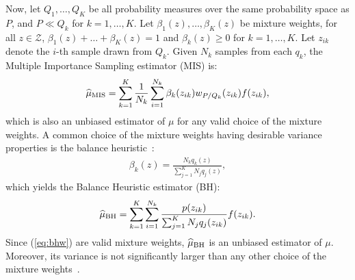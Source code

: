 \documentclass{article}
\begin{document}
Now, let $Q_1,\dots,Q_K$ be all probability measures over the same probability space as $P$, and $P\ll Q_k$ for $k=1,\dots,K$. Let $\beta_1(z),\dots,\beta_K(z)$ be mixture weights, \ie for all $z\in\mathcal{Z}$, ${\beta_1(z)+\dots+\beta_K(z) = 1}$ and $\beta_k(z)\geq0$ for ${k=1,\dots,K}$. Let $z_{ik}$ denote the $i$-th sample drawn from $Q_k$. Given $N_k$ \iid samples from each $q_k$, the Multiple Importance Sampling estimator (MIS) is:
\begin{align}\label{eq:mise}
	\widehat{\mu}_{\text{MIS}} = \sum_{k=1}^K\frac{1}{N_k}\sum_{i=1}^{N_k}\beta_k(z_{ik})w_{P/Q_k}(z_{ik})f(z_{ik}),
\end{align}
which is also an unbiased estimator of $\mu$ for any valid choice of the mixture weights. A common choice of the mixture weights having desirable variance properties is the balance heuristic~\citep{veach_optimally_1995}: 
\begin{align}\label{eq:bhw}
	\beta_k(z) = \frac{N_kq_k(z)}{\sum_{j=1}^{K}N_jq_j(z)},
\end{align}
which yields the Balance Heuristic estimator (BH):
\begin{align}\label{eq:bhe}
	\widehat{\mu}_{\text{BH}} = \sum_{k=1}^K\sum_{i=1}^{N_k}\frac{p(z_{ik})}{\sum_{j=1}^K N_jq_j(z_{ik})}f(z_{ik}).
\end{align}
Since (\ref{eq:bhw}) are valid mixture weights, $\widehat{\mu}_{\text{BH}}$ is an unbiased estimator of $\mu$. Moreover, its variance is not significantly larger than any other choice of the mixture weights~\citep[][Theorem 1]{veach_optimally_1995}.
\end{document}
